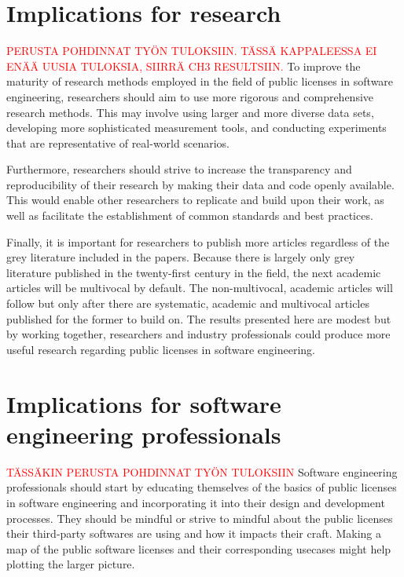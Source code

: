 \section{Implications for research}
\textcolor{red}{PERUSTA POHDINNAT TYÖN TULOKSIIN. TÄSSÄ KAPPALEESSA EI ENÄÄ UUSIA TULOKSIA, SIIRRÄ CH3 RESULTSIIN.}
To improve the maturity of research methods employed in the field of public licenses in software engineering, researchers should aim to use more rigorous and comprehensive research methods. This may involve using larger and more diverse data sets, developing more sophisticated measurement tools, and conducting experiments that are representative of real-world scenarios.

Furthermore, researchers should strive to increase the transparency and reproducibility of their research by making their data and code openly available. This would enable other researchers to replicate and build upon their work, as well as facilitate the establishment of common standards and best practices.

Finally, it is important for researchers to publish more articles regardless of the grey literature included in the papers. Because there is largely only grey literature published in the twenty-first century in the field, the next academic articles will be multivocal by default. The non-multivocal, academic articles will follow but only after there are systematic, academic and multivocal articles published for the former to build on. The results presented here are modest but by working together, researchers and industry professionals could produce more useful research regarding public licenses in software engineering.

\section{Implications for software engineering professionals}
\textcolor{red}{TÄSSÄKIN PERUSTA POHDINNAT TYÖN TULOKSIIN}
Software engineering professionals should start by educating themselves of the basics of public licenses in software engineering and incorporating it into their design and development processes. They should be mindful or strive to mindful about the public licenses their third-party softwares are using and how it impacts their craft. Making a map of the public software licenses and their corresponding usecases might help plotting the larger picture.

